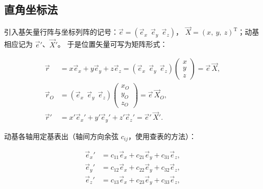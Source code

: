 \begin{center}
\end{center}

\subsection{直角坐标法}

引入基矢量行阵与坐标列阵的记号：$\vec e = (\vec e_x\ \ \vec e_y\ \ \vec e_z)$，
$\vec X = (x,\ y,\ z)^{\mathrm T}$；动基相应记为 $\vec e'$、$\vec X'$。
于是位置矢量可写为矩阵形式：

\begin{equation}\label{eq:8-pos-matrix}
\begin{aligned}
  \vec r   &= x\vec e_x + y\vec e_y + z\vec e_z
            = (\vec e_x\ \ \vec e_y\ \ \vec e_z)\begin{pmatrix}x\\y\\z\end{pmatrix}
            = \vec e\,\vec X,\\
  \vec r_O &= (\vec e_x\ \ \vec e_y\ \ \vec e_z)\begin{pmatrix}x_O\\y_O\\z_O\end{pmatrix}
            = \vec e\,\vec X_O,\\
  \vec r'  &= x'\vec e_x' + y'\vec e_y' + z'\vec e_z' = \vec e'\,\vec X' .
\end{aligned}
\end{equation}

动基各轴用定基表出（轴间方向余弦 $c_{ij}$，使用查表的方法）：

\begin{equation}\label{eq:8-dir-cos}
\begin{aligned}
  \vec e_x' &= c_{11}\vec e_x + c_{21}\vec e_y + c_{31}\vec e_z,\\
  \vec e_y' &= c_{12}\vec e_x + c_{22}\vec e_y + c_{32}\vec e_z,\\
  \vec e_z' &= c_{13}\vec e_x + c_{23}\vec e_y + c_{33}\vec e_z,
\end{aligned}
\end{equation}

